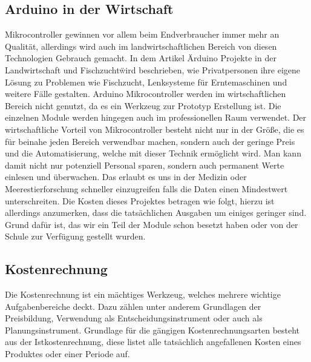 \subsection{Arduino in der Wirtschaft}
Mikrocontroller gewinnen vor allem beim Endverbraucher immer mehr an Qualität, allerdings wird auch im landwirtschaftlichen Bereich von diesen Technologien Gebrauch gemacht. In dem Artikel \"Arduino Projekte in der Landwirtschaft und Fischzucht\" wird beschrieben, wie Privatpersonen ihre eigene Lösung zu Problemen wie Fischzucht, Lenksysteme für Erntemaschinen und weitere Fälle gestalten.
Arduino Mikrocontroller werden im wirtschaftlichen Bereich nicht genutzt, da es ein Werkzeug zur Prototyp Erstellung ist. Die einzelnen Module werden hingegen auch im professionellen Raum verwendet.  Der wirtschaftliche Vorteil von Mikrocontroller besteht nicht nur in der Größe, die es für beinahe jeden Bereich verwendbar machen, sondern auch der geringe Preis und die Automatisierung, welche mit dieser Technik ermöglicht wird. Man kann damit nicht nur potenziell Personal sparen, sondern auch permanent Werte einlesen und überwachen. Das erlaubt es uns in der Medizin oder Meerestierforschung schneller einzugreifen falls die Daten einen Mindestwert unterschreiten. Die Kosten dieses Projektes betragen wie folgt, hierzu ist allerdings anzumerken, dass die tatsächlichen Ausgaben um einiges geringer sind. Grund dafür ist, das wir ein Teil der Module schon besetzt haben oder von der Schule zur Verfügung gestellt wurden.



\subsection{Kostenrechnung}

Die Kostenrechnung ist ein mächtiges Werkzeug, welches mehrere wichtige Aufgabenbereiche deckt. Dazu zählen unter anderem Grundlagen der Preisbildung, Verwendung als Entscheidungsinstrument oder auch als Planungsinstrument. Grundlage für die gängigen Kostenrechnungsarten besteht aus der Istkostenrechnung, diese listet alle tatsächlich angefallenen Kosten eines Produktes oder einer Periode auf. \cite{KORE}

